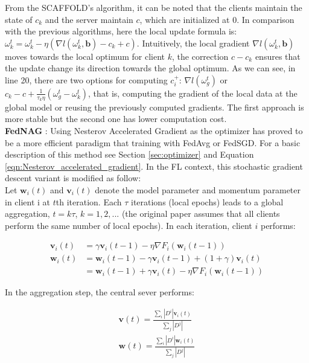 From the SCAFFOLD's algorithm, it can be noted that the clients maintain the state of $c_k$ and the server maintain $c$, which are initialized at 0.
In comparison with the previous algorithms, here the local update formula is: $\omega_k^t = \omega_k^t - \eta (\nabla l (\omega_k^t, \mathbf{b}) - c_k + c)$. Intuitively, the local gradient $\nabla l (\omega_k^t, \mathbf{b})$ moves towards the local optimum for client $k$, the correction $c - c_k$ ensures that the update change its direction towards the global optimum.
As we can see, in line 20, there are two options for computing $c_i^+$: $\nabla l(\omega_g^t)$ or $c_k - c + \frac{1}{\tau_k \eta} (\omega_g^t - \omega_k^t)$, that is, computing the gradient of the local data at the global model or reusing the previously computed gradients. The first approach is more stable but the second one has lower computation cost.\\

\textbf{FedNAG} \cite{yang2022}: Using Nesterov Accelerated Gradient as the optimizer has proved to be a more efficient paradigm that training with FedAvg or FedSGD. For a basic description of this method see Section \ref{sec:optimizer} and Equation \ref{eqn:Nesterov_accelerated_gradient}. In the FL context, this stochastic gradient descent variant is modified as follow:\\
Let $\boldsymbol{w}_i (t)$ and $\boldsymbol{v}_i(t)$ denote the model parameter and momentum parameter in client i at $t$th iteration. Each $\tau$ iterations (local epochs) leads to a global aggregation, $t = k\tau$, $k=1,2,...$ (the original paper assumes that all clients perform the same number of local epochs). In each iteration, client $i$ performs:

\begin{align*}
  \boldsymbol{v}_i(t) &= \gamma \boldsymbol{v}_i(t-1) - \eta \nabla F_i (\boldsymbol{w}_i(t-1))\\
  \boldsymbol{w}_i(t) &= \boldsymbol{w}_i(t-1) - \gamma \boldsymbol{v}_i (t-1) + (1+\gamma) \boldsymbol{v}_i(t)\\
  &= \boldsymbol{w}_i(t-1) + \gamma \boldsymbol{v}_i(t) - \eta \nabla F_i(\boldsymbol{w}_i(t-1))
\end{align*}

In the aggregation step, the central sever performs:

\begin{align*}
  \boldsymbol{v}(t) = \frac{\sum_{i} |D^i| \boldsymbol{v}_i(t)}{\sum_j |D^j|} \\
  \boldsymbol{w}(t) = \frac{\sum_{i} |D^i| \boldsymbol{w}_i(t)}{\sum_j |D^j|}
\end{align*}

